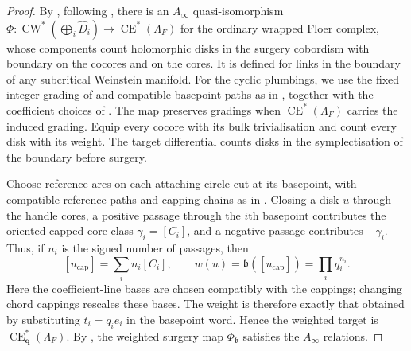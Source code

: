 \documentclass[a4paper]{amsart}
\DeclareMathOperator{\CW}{CW}
\DeclareMathOperator{\CE}{CE}
\numberwithin{equation}{section}
\begin{document}
\begin{proof}
By \cite[Theorem~2 and Theorem~83]{ELduality},
following \cite[Section~5.4 and Remark~5.9]{BEE}, there is an
$A_\infty$ quasi-isomorphism
$\Phi:\CW^*(\bigoplus_i\widehat D_i)\to\CE^*(\Lambda_F)$ for the
ordinary wrapped Floer complex, whose components count holomorphic
disks in the surgery cobordism with boundary on the cocores and on the
cores. It is defined for links in the boundary of any subcritical
Weinstein manifold. For the cyclic plumbings, we use the
fixed integer grading of  and
compatible basepoint paths as in
\cite[Appendix~A, Remark~72]{ELduality}, together with the coefficient
choices of . The map preserves gradings when
$\CE^*(\Lambda_F)$ carries the induced grading. Equip every cocore with
its bulk trivialisation and count every disk with its weight. The
target differential counts disks in the symplectisation of the
boundary before surgery.

Choose reference arcs on each attaching circle cut at its basepoint,
with compatible reference paths and capping chains as in
. Closing a disk $u$ through the handle cores,
a positive passage through the $i$th basepoint contributes the oriented
capped core class $\gamma_i=[C_i]$, and a negative passage contributes
$-\gamma_i$. Thus, if $n_i$ is the signed number of passages, then
\[
 [u_{\mathrm{cap}}]=\sum_i n_i[C_i],\qquad
 w(u)=\mathfrak b([u_{\mathrm{cap}}])=\prod_i q_i^{n_i}.
\]
Here the coefficient-line bases are chosen compatibly with the cappings;
changing chord cappings rescales these bases. The weight is therefore
exactly that obtained by substituting $t_i=q_ie_i$ in the basepoint
word. Hence the weighted target is $\CE^*_{\boldsymbol q}(\Lambda_F)$.
By , the weighted surgery map
$\Phi_{\mathfrak b}$ satisfies the $A_\infty$ relations.


\end{proof}
\end{document}
